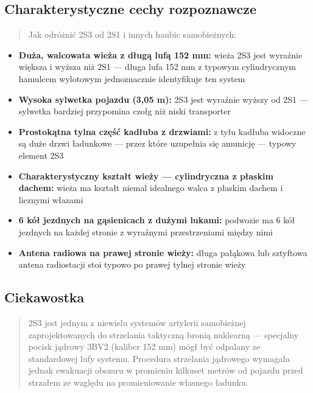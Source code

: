 \documentclass[12pt,oneside]{book}
\providecommand{\tightlist}{%
  \setlength{\itemsep}{0pt}\setlength{\parskip}{0pt}}
\begin{document}
\subsection{Charakterystyczne cechy
rozpoznawcze}\label{charakterystyczne-cechy-rozpoznawcze-20}

\begin{quote}
Jak odróżnić 2S3 od 2S1 i innych haubic samobieżnych:
\end{quote}

\begin{itemize}
\tightlist
\item
  \textbf{Duża, walcowata wieża z długą lufą 152 mm:} wieża 2S3 jest
  wyraźnie większa i wyższa niż 2S1 --- długa lufa 152 mm z typowym
  cylindrycznym hamulcem wylotowym jednoznacznie identyfikuje ten system
\item
  \textbf{Wysoka sylwetka pojazdu (3,05 m):} 2S3 jest wyraźnie wyższy od
  2S1 --- sylwetka bardziej przypomina czołg niż niski transporter
\item
  \textbf{Prostokątna tylna część kadłuba z drzwiami:} z tyłu kadłuba
  widoczne są duże drzwi ładunkowe --- przez które uzupełnia się
  amunicję --- typowy element 2S3
\item
  \textbf{Charakterystyczny kształt wieży --- cylindryczna z płaskim
  dachem:} wieża ma kształt niemal idealnego walca z płaskim dachem i
  licznymi włazami
\item
  \textbf{6 kół jezdnych na gąsienicach z dużymi lukami:} podwozie ma 6
  kół jezdnych na każdej stronie z wyraźnymi przestrzeniami między nimi
\item
  \textbf{Antena radiowa na prawej stronie wieży:} długa pałąkowa lub
  sztyftowa antena radiostacji stoi typowo po prawej tylnej stronie
  wieży
\end{itemize}

\subsection{Ciekawostka}\label{ciekawostka-20}

\begin{quote}
2S3 jest jednym z niewielu systemów artylerii samobieżnej
zaprojektowanych do strzelania taktyczną bronią nuklearną --- specjalny
pocisk jądrowy 3BV2 (kaliber 152 mm) mógł być odpalany ze standardowej
lufy systemu. Procedura strzelania jądrowego wymagała jednak ewakuacji
obszaru w promieniu kilkuset metrów od pojazdu przed strzałem ze względu
na promieniowanie własnego ładunku.
\end{quote}
\end{document}
